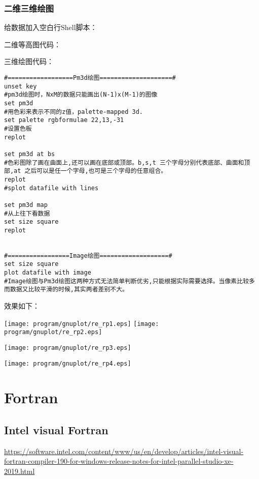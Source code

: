 \subsubsection{二维三维绘图}
给数据加入空白行Shell脚本：

二维等高图代码：

三维绘图代码：
\begin{lstlisting}[language=gnuplot]
#==================Pm3d绘图====================#
unset key
#pm3d绘图时，NxM的数据只能画出(N-1)x(M-1)的图像
set pm3d
#用色彩来表示不同的z值，palette-mapped 3d.
set palette rgbformulae 22,13,-31
#设置色板
replot

set pm3d at bs
#色彩图除了画在曲面上,还可以画在底部或顶部。b,s,t 三个字母分别代表底部、曲面和顶部,at 之后可以是任一个字母,也可是三个字母的任意组合。
replot
#splot datafile with lines

set pm3d map
#从上往下看数据
set size square
replot


#=================Image绘图===================#
set size square
plot datafile with image
#Image绘图与Pm3d绘图这两种方式无法简单判断优劣,只能根据实际需要选择。当像素比较多而数据又比较平滑的时候,其实两者差别不大。
\end{lstlisting}


效果如下：

\texttt{[image: program/gnuplot/re\_rp1.eps]}
\texttt{[image: program/gnuplot/re\_rp2.eps]}

\texttt{[image: program/gnuplot/re\_rp3.eps]}

\texttt{[image: program/gnuplot/re\_rp4.eps]}







\newpage
\section{Fortran}
\subsection{Intel visual Fortran}
\url{https://software.intel.com/content/www/us/en/develop/articles/intel-visual-fortran-compiler-190-for-windows-release-notes-for-intel-parallel-studio-xe-2019.html}

